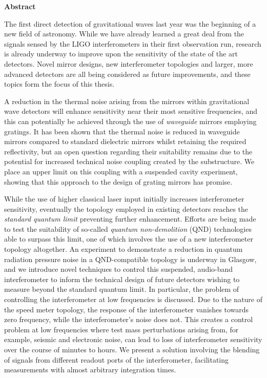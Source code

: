 \begin{preface}
\begin{center} {\bf Abstract}\end{center}

The first direct detection of gravitational waves last year was the beginning of a new field of astronomy. While we have already learned a great deal from the signals sensed by the LIGO interferometers in their first observation run, research is already underway to improve upon the sensitivity of the state of the art detectors. Novel mirror designs, new interferometer topologies and larger, more advanced detectors are all being considered as future improvements, and these topics form the focus of this thesis.

A reduction in the thermal noise arising from the mirrors within gravitational wave detectors will enhance sensitivity near their most sensitive frequencies, and this can potentially be achieved through the use of \emph{waveguide} mirrors employing gratings. It has been shown that the thermal noise is reduced in waveguide mirrors compared to standard dielectric mirrors whilst retaining the required reflectivity, but an open question regarding their suitability remains due to the potential for increased technical noise coupling created by the substructure. We place an upper limit on this coupling with a suspended cavity experiment, showing that this approach to the design of grating mirrors has promise.

While the use of higher classical laser input initially increases interferometer sensitivity, eventually the \MI{} topology employed in existing detectors reaches the \emph{standard quantum limit} preventing further enhancement. Efforts are being made to test the suitability of so-called \emph{quantum non-demolition} (QND) technologies able to surpass this limit, one of which involves the use of a new interferometer topology altogether. An experiment to demonstrate a reduction in quantum radiation pressure noise in a QND-compatible \SSM{} topology is underway in Glasgow, and we introduce novel techniques to control this suspended, audio-band interferometer to inform the technical design of future detectors wishing to measure beyond the standard quantum limit. In particular, the problem of controlling the interferometer at low frequencies is discussed. Due to the nature of the speed meter topology, the response of the interferometer vanishes towards zero frequency, while the interferometer's noise does not. This creates a control problem at low frequencies where test mass perturbations arising from, for example, seismic and electronic noise, can lead to loss of interferometer sensitivity over the course of minutes to hours. We present a solution involving the blending of signals from different readout ports of the interferometer, facilitating measurements with almost arbitrary integration times.


\end{preface}
